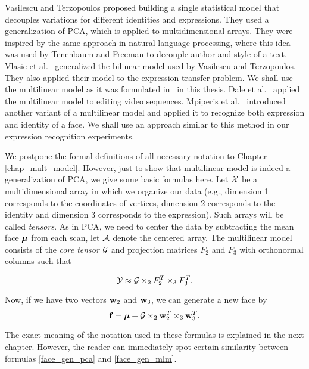 Vasilescu and Terzopoulos \cite{vt_2002} 
proposed building a single statistical  model that decouples
variations for different identities
and expressions. They
used a generalization of PCA,
which is  applied  to multidimensional arrays.
They were inspired by the same approach in natural language processing,
where this idea was  used by Tenenbaum and Freeman \cite{Tenenbaum_2000} to decouple author 
and style of a text.
Vlasic et al.~\cite{vlasic}  generalized the bilinear model 
used by Vasilescu and Terzopoulos. They also applied their model
to the expression transfer problem. We shall use the multilinear model as it 
was formulated in~\cite{vlasic} in this thesis.  
Dale et al.~\cite{dale} applied the multilinear model to editing video 
sequences. Mpiperis et al.~\cite{mpip} introduced another variant
of a multilinear model and applied it to recognize both expression and identity
of a face. We shall use an approach similar to this method
 in our expression recognition experiments.



We postpone the formal definitions of all necessary notation to Chapter \ref{chap_mult_model}.
However, just to show that multilinear model is indeed a generalization 
of PCA, we give some basic formulas here.  Let $\mathcal{X}$ be a multidimensional
array in which we organize our data (e.g., dimension 1 corresponds to the coordinates
of vertices, dimension 2 corresponds to the identity and dimension 3 corresponds to the expression).
Such arrays will be called 
\textit{tensors}.
As in PCA, we need to center the data by subtracting the mean face ${\boldsymbol{\mu}}$ from each scan, let $\mathcal{A}$
denote the centered array.
The multilinear model consists of the
\textit{core tensor} $\mathcal{G}$ and projection matrices $F_2$ and $F_3$ with orthonormal columns such that

\begin{equation}
\label{tucker_prelim}
\mathcal{Y}  \approx \mathcal{G} \times_2 F_2^T \times_3 F_3^T .
\end{equation}

Now, if we have two vectors ${\mathbf{w}}_2$ and ${\mathbf{w}}_3$, we can generate a new face by
\begin{equation}
\label{face_gen_mlm}
{\mathbf{f}} = {\boldsymbol{\mu}} + \mathcal{G} \times_2 {\mathbf{w}}_2^T \times_3 {\mathbf{w}}_3^T.
\end{equation}

The exact meaning of the notation used in these formulas is explained in the next chapter. However,
the reader can immediately spot certain similarity between formulas \eqref{face_gen_pca}
and \eqref{face_gen_mlm}.

